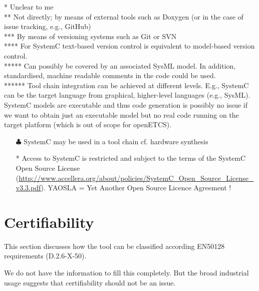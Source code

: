 \begin{assesor1}
\begin{author_comment}
  * Unclear to me\\
  ** Not directly; by means of external tools such as Doxygen (or in the case of issue tracking, e.g., GitHub)\\
 *** By means of versioning systems such as Git or SVN\\
**** For SystemC text-based version control is equivalent to model-based version control.\\
***** Can possibly be covered by an associated SysML model. In addition, standardised, machine readable comments in the code could be used.\\
****** Tool chain integration can be achieved at different levels. E.g., SystemC can be the target language from graphical, higher-level languages (e.g., SysML). SystemC models are executable and thus code generation is possibly no issue if we want to obtain just an executable model but no real code running on the target platform (which is out of scope for openETCS).
\end{author_comment}
\begin{assessor1}
\begin{itemize}
\item[$\clubsuit$] SystemC may be used in a tool chain cf. hardware synthesis
\end{itemize}
\end{assessor1}



\begin{assessor2}
  \begin{itemize}
  \item[*] Access to SystemC is restricted and subject to the terms of
    the SystemC Open Source License
    (\url{http://www.accellera.org/about/policies/SystemC_Open_Source_License_v3.3.pdf}). YAOSLA
    = Yet Another Open Source Licence Agreement !
  \end{itemize}  
\end{assessor2}


\section{Certifiability}

This section discusses how the tool can be classified according EN50128 requirements (D.2.6-X-50).

\begin{author_comment}
  We do not have the information to fill this completely. But the broad industrial usage suggests that certifiability should not be an issue.
\end{author_comment}


\end{assesor1}
